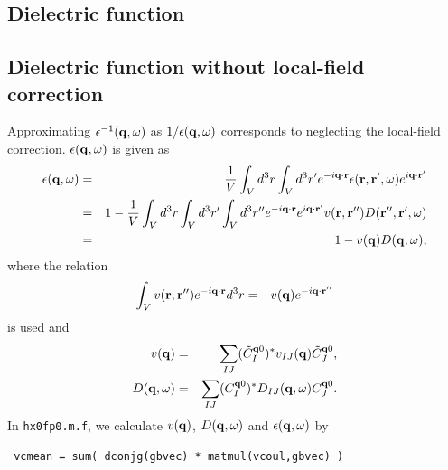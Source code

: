 \documentclass[a4paper,10pt,epsf,fleqn]{article}
\begin{document}
{{{\begin{thebibliography}{00}
\newpage

\section{Dielectric function}

\subsection{Dielectric function without local-field correction}

Approximating $\epsilon^{-1}({\bf q},\omega)$ as $1/\epsilon({\bf q},\omega)$
corresponds to neglecting the local-field correction.
$\epsilon({\bf q},\omega)$ is given as 
\begin{eqnarray}
  \epsilon({\bf q},\omega) 
 &=& \frac{1}{V}
  \int_V d^3r \int_V d^3r' e^{-i{\bf q}\cdot{\bf r}}
  \epsilon({\bf r},{\bf r}',\omega)e^{i{\bf q}\cdot{\bf r}'} \nonumber \\
 &=& 1 - \frac{1}{V} \int_V d^3r \int_V d^3r' \int_V d^3r''
  e^{-i{\bf q}\cdot{\bf r}} e^{i{\bf q}\cdot{\bf r}'} 
  v({\bf r,r''})D({\bf r'',r'},\omega)  \nonumber \\
 &=& 1 - v({\bf q})D({\bf q},\omega),
           \label{eq. eps1}
\end{eqnarray}
where the relation
\begin{eqnarray}
   \int_V v({\bf r},{\bf r}'')e^{-i{\bf q}\cdot{\bf r}}d^3r 
  &=& v({\bf q})e^{-i{\bf q \cdot r''}}
\end{eqnarray}
is used and 
\begin{eqnarray}
   v({\bf q}) &=& \sum_{IJ}( \tilde{C}^{{\bf q}0}_I )^*
                v_{IJ}({\bf q})\tilde{C}^{{\bf q}0}_J , \\
   D({\bf q},\omega) 
              &=& \sum_{IJ}( C^{{\bf q}0}_I )^*
                D_{IJ}({\bf q},\omega) C^{{\bf q}0}_J.     
\end{eqnarray}
In \verb|hx0fp0.m.f|, we calculate $v({\bf q})$, $D({\bf q},\omega)$ 
and $\epsilon({\bf q},\omega)$ by
\begin{center}
    \verb| vcmean = sum( dconjg(gbvec) * matmul(vcoul,gbvec) )   |
    

\end{center}
\end{thebibliography}}}}
\end{document}
